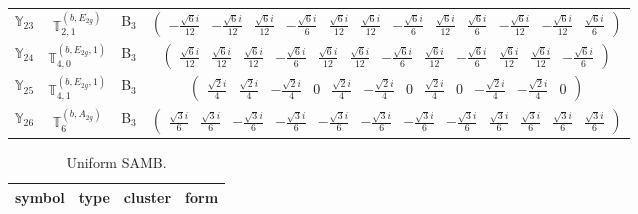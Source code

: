 \documentclass[fleqn,10pt,landscape]{article}
\begin{document}
\begin{itemize}
\begin{center}
\begin{longtable}{c|c|c|c}
$ \mathbb{Y}_{23} $ & $\mathbb{T}_{2,1}^{(b,E_{2g})}$ & B$_{3}$ & $\begin{pmatrix} - \frac{\sqrt{6} i}{12} & - \frac{\sqrt{6} i}{12} & \frac{\sqrt{6} i}{12} & - \frac{\sqrt{6} i}{6} & \frac{\sqrt{6} i}{12} & \frac{\sqrt{6} i}{12} & - \frac{\sqrt{6} i}{6} & \frac{\sqrt{6} i}{12} & \frac{\sqrt{6} i}{6} & - \frac{\sqrt{6} i}{12} & - \frac{\sqrt{6} i}{12} & \frac{\sqrt{6} i}{6} \end{pmatrix}$ \\
$ \mathbb{Y}_{24} $ & $\mathbb{T}_{4,0}^{(b,E_{2g},1)}$ & B$_{3}$ & $\begin{pmatrix} \frac{\sqrt{6} i}{12} & \frac{\sqrt{6} i}{12} & \frac{\sqrt{6} i}{12} & - \frac{\sqrt{6} i}{6} & \frac{\sqrt{6} i}{12} & \frac{\sqrt{6} i}{12} & - \frac{\sqrt{6} i}{6} & \frac{\sqrt{6} i}{12} & - \frac{\sqrt{6} i}{6} & \frac{\sqrt{6} i}{12} & \frac{\sqrt{6} i}{12} & - \frac{\sqrt{6} i}{6} \end{pmatrix}$ \\
$ \mathbb{Y}_{25} $ & $\mathbb{T}_{4,1}^{(b,E_{2g},1)}$ & B$_{3}$ & $\begin{pmatrix} \frac{\sqrt{2} i}{4} & \frac{\sqrt{2} i}{4} & - \frac{\sqrt{2} i}{4} & 0 & \frac{\sqrt{2} i}{4} & - \frac{\sqrt{2} i}{4} & 0 & \frac{\sqrt{2} i}{4} & 0 & - \frac{\sqrt{2} i}{4} & - \frac{\sqrt{2} i}{4} & 0 \end{pmatrix}$ \\
$ \mathbb{Y}_{26} $ & $\mathbb{T}_{6}^{(b,A_{2g})}$ & B$_{3}$ & $\begin{pmatrix} \frac{\sqrt{3} i}{6} & \frac{\sqrt{3} i}{6} & - \frac{\sqrt{3} i}{6} & - \frac{\sqrt{3} i}{6} & - \frac{\sqrt{3} i}{6} & - \frac{\sqrt{3} i}{6} & - \frac{\sqrt{3} i}{6} & - \frac{\sqrt{3} i}{6} & \frac{\sqrt{3} i}{6} & \frac{\sqrt{3} i}{6} & \frac{\sqrt{3} i}{6} & \frac{\sqrt{3} i}{6} \end{pmatrix}$ \\
\end{longtable}
\end{center}
\begin{center}
\renewcommand{\arraystretch}{1.3}
\begin{longtable}{c|c|c|c}
\caption{Uniform SAMB.}
 \\
 \hline \hline
symbol & type & cluster & form \\ \hline \endfirsthead


\end{longtable}
\end{center}
\end{itemize}
\end{document}
